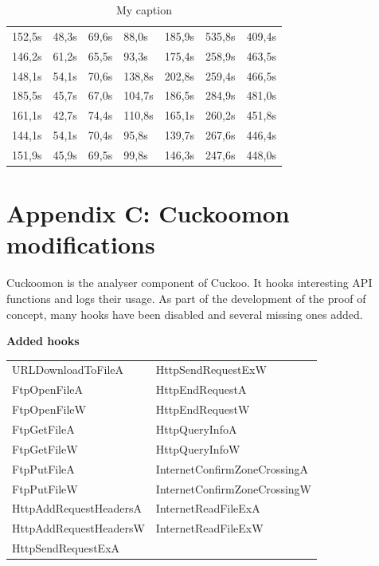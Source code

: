 \documentclass{scrartcl}
\begin{document}
\begin{table}[h]
\begin{tabular}{@{}lllllll@{}}
152,5s    & 48,3s      & 69,6s      & 88,0s       & 185,9s      & 535,8s      & 409,4s       \\
146,2s    & 61,2s      & 65,5s      & 93,3s       & 175,4s      & 258,9s      & 463,5s       \\
148,1s    & 54,1s      & 70,6s      & 138,8s      & 202,8s      & 259,4s      & 466,5s       \\
185,5s    & 45,7s      & 67,0s      & 104,7s      & 186,5s      & 284,9s      & 481,0s       \\
161,1s    & 42,7s      & 74,4s      & 110,8s      & 165,1s      & 260,2s      & 451,8s       \\
144,1s    & 54,1s      & 70,4s      & 95,8s       & 139,7s      & 267,6s      & 446,4s       \\
151,9s    & 45,9s      & 69,5s      & 99,8s       & 146,3s      & 247,6s      & 448,0s       \\ \bottomrule
\end{tabular}
\caption{My caption}
\label{my-label}
\end{table}

\clearpage

\section*{Appendix C: Cuckoomon modifications}


Cuckoomon is the analyser component of Cuckoo. It hooks interesting API functions and logs their usage. As part of the development of the proof of concept, many hooks have been disabled and several missing ones added.

\textbf{Added hooks}

\begin{longtable}{*{2}{>{\arraybackslash}p{6cm}}}
URLDownloadToFileA     & HttpSendRequestExW           \\
FtpOpenFileA           & HttpEndRequestA              \\
FtpOpenFileW           & HttpEndRequestW              \\
FtpGetFileA            & HttpQueryInfoA               \\
FtpGetFileW            & HttpQueryInfoW               \\
FtpPutFileA            & InternetConfirmZoneCrossingA \\
FtpPutFileW            & InternetConfirmZoneCrossingW \\
HttpAddRequestHeadersA & InternetReadFileExA          \\
HttpAddRequestHeadersW & InternetReadFileExW          \\
HttpSendRequestExA     &                             
\end{longtable}
\end{document}
